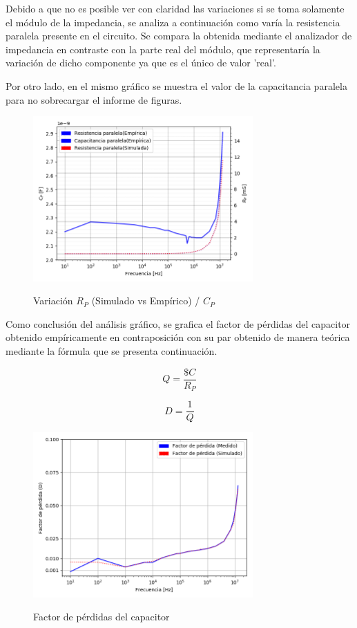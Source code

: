 Debido a que no es posible ver con claridad las variaciones si se toma solamente el módulo de la impedancia, se analiza a continuación como varía la resistencia paralela presente en el circuito. Se compara la obtenida mediante el analizador de impedancia en contraste con la parte real del módulo, que representaría la variación de dicho componente ya que es el único de valor 'real'.\par
Por otro lado, en el mismo gráfico se muestra el valor de la capacitancia paralela para no sobrecargar el informe de figuras.
\begin{figure}[H]
\centering
\includegraphics[width=0.75\textwidth]{Ejercicio_1(Germo)/Grafico/capacitor_relacion_C_P_y_R_p.png}
\label{fig:capacitor_relacion_C_P_y_R_p}
\caption{Variación $R_P$ (Simulado vs Empírico) / $C_P$ }
\end{figure}

Como conclusión del análisis gráfico, se grafica el factor de pérdidas del capacitor obtenido empíricamente en contraposición con su par obtenido de manera teórica mediante la fórmula que se presenta continuación.

\begin{equation}
Q= \frac{\$C}{R_P}
\end{equation}
\par
\begin{equation}
D= \frac{1}{Q}
\end{equation}

\begin{figure}[H]
\centering
\includegraphics[width=0.75\textwidth]{Ejercicio_1(Germo)/Grafico/capacitor_factor_de_perdida.png}
\label{fig:capacitor_factor_de_perdida}
\caption{Factor de pérdidas del capacitor}
\end{figure}

